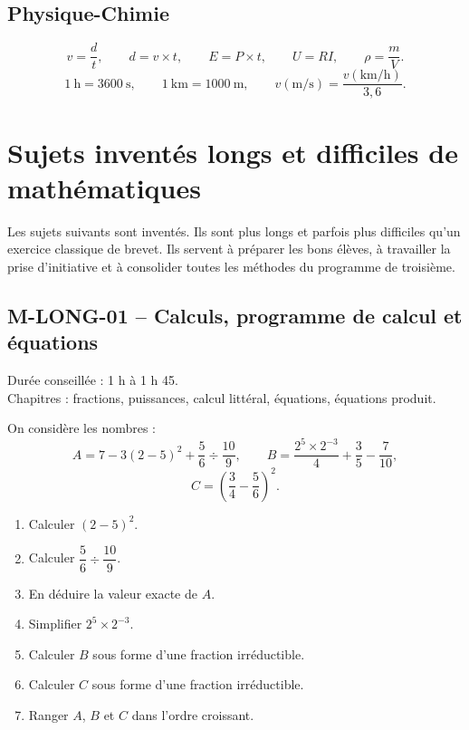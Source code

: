 \documentclass[11pt,a4paper]{article}
\newcounter{exercice}
\begin{document}
\subsection{Physique-Chimie}
\begin{retenir}
\[
v=\frac{d}{t},
\qquad
d=v\times t,
\qquad
E=P\times t,
\qquad
U=RI,
\qquad
\rho=\frac{m}{V}.
\]
\[
1\ \mathrm{h}=3600\ \mathrm{s},
\qquad
1\ \mathrm{km}=1000\ \mathrm{m},
\qquad
v(\mathrm{m/s})=\frac{v(\mathrm{km/h})}{3{,}6}.
\]
\end{retenir}
\newpage
\section{Sujets inventés longs et difficiles de mathématiques}

\begin{attention}
Les sujets suivants sont inventés. Ils sont plus longs et parfois plus difficiles qu'un exercice classique de brevet. Ils servent à préparer les bons élèves, à travailler la prise d'initiative et à consolider toutes les méthodes du programme de troisième.
\end{attention}
\subsection{M-LONG-01 -- Calculs, programme de calcul et équations}

\begin{objectif}
Durée conseillée : 1 h à 1 h 45.\\
Chapitres : fractions, puissances, calcul littéral, équations, équations produit.
\end{objectif}
\begin{exercice}
On considère les nombres :
\[
A=7-3(2-5)^2+\frac{5}{6}\div\frac{10}{9},
\qquad
B=\frac{2^5\times 2^{-3}}{4}+\frac{3}{5}-\frac{7}{10},
\]
\[
C=\left(\frac{3}{4}-\frac{5}{6}\right)^2.
\]
\begin{enumerate}
  \item Calculer $(2-5)^2$.
  \item Calculer $\dfrac{5}{6}\div\dfrac{10}{9}$.
  \item En déduire la valeur exacte de $A$.
  \item Simplifier $2^5\times2^{-3}$.
  \item Calculer $B$ sous forme d'une fraction irréductible.
  \item Calculer $C$ sous forme d'une fraction irréductible.
  \item Ranger $A$, $B$ et $C$ dans l'ordre croissant.
\end{enumerate}
\end{exercice}
\end{document}
